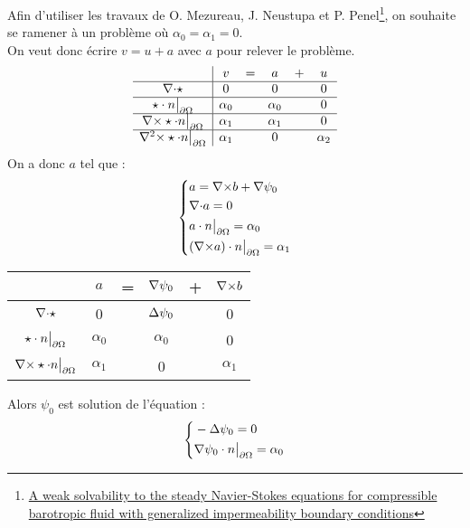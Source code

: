 Afin d'utiliser les travaux de O. Mezureau, J. Neustupa et P. Penel\footnote{\href{http://www.researchgate.net/publication/254219219\_A\_weak\_solvability\_to\_the\_steady\_NavierStokes\_equations\_for\_compressible\_barotropic\_fluid\_with\_generalized\_impermeability\_boundary\_conditions}{A weak solvability to the steady Navier-Stokes equations for compressible barotropic fluid with generalized impermeability boundary conditions}}, on souhaite se ramener à un problème où $\alpha_0=\alpha_1=0$.\\
On veut donc écrire $v=u+a$ avec $a$ pour relever le problème.
\begin{eqnarray}
\label{v}
\begin{array}{c|ccccc}
& v & = & a & + & u\\ \hline
{\nabla\cdot}\star & 0 & & 0 & & 0\\ \hline
\star\cdot n{\big\rvert_{\partial\Omega}} & \alpha_0 & & \alpha_0 & & 0\\ \hline
{\nabla\times}\star\cdot n{\big\rvert_{\partial\Omega}} & \alpha_1 & & \alpha_1 & & 0\\ \hline
{\nabla^2\times}\star\cdot n{\big\rvert_{\partial\Omega}} & \alpha_1 & & 0 & & \alpha_2 
\end{array}
\end{eqnarray}
On a donc $a$ tel que :
\begin{eqnarray}
\label{aegal}
\left\{
\begin{aligned}
&a={\nabla\times} b+{\nabla}\psi_0\\
&{\nabla\cdot} a =0\\
&a\cdot n{\big\rvert_{\partial\Omega}} = \alpha_0\\
&({\nabla\times} a)\cdot n{\big\rvert_{\partial\Omega}} = \alpha_1
\end{aligned}
\right.
\end{eqnarray}
\begin{center}
\begin{tabular}{c|ccccc}
& $a$ & = & ${\nabla}\psi_0$ & + & ${\nabla\times} b$ \\ \hline
${\nabla\cdot}\star$ & 0 & & ${\Delta}\psi_0$ & & 0\\ \hline
$\star\cdot n{\big\rvert_{\partial\Omega}}$ & $\alpha_0$ & & $\alpha_0$ & & 0\\ \hline
${\nabla\times}\star\cdot n{\big\rvert_{\partial\Omega}}$ & $\alpha_1$ & & 0 & & $\alpha_1$
\end{tabular}
\end{center}
Alors $\psi_0$ est solution de l'équation :
\begin{eqnarray}
\label{psi0}
\left\{
\begin{aligned}
&-{\Delta}\psi_0 = 0\\
&{\nabla}\psi_0\cdot n{\big\rvert_{\partial\Omega}}=\alpha_0
\end{aligned}
\right.
\end{eqnarray}
